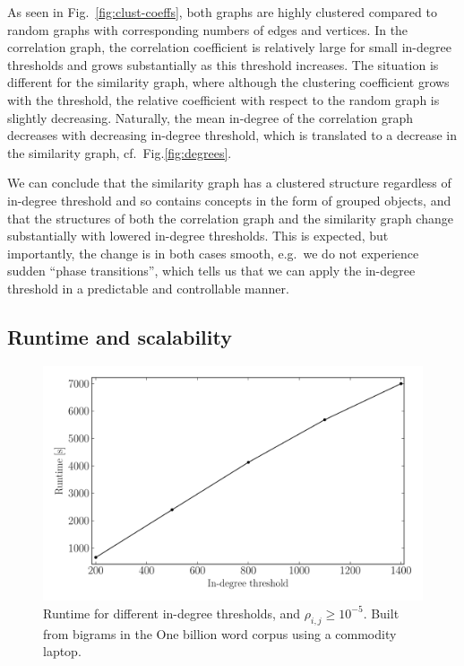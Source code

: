 \documentclass{kais}
\newcommand{\rn}[1]{\rho_{#1}}
\begin{document}
As seen in Fig.\ \ref{fig:clust-coeffs}, both graphs are highly clustered compared to random graphs with corresponding 
numbers of edges and vertices. In the correlation graph, the correlation coefficient is relatively large for small in-degree 
thresholds and grows substantially as this threshold increases. The situation is different for the similarity graph, where although the
clustering coefficient grows with the threshold, the relative coefficient with respect to the random graph is slightly decreasing.
Naturally, the mean in-degree of the correlation graph decreases with decreasing in-degree threshold,
which is translated to a decrease in the similarity graph, cf.\ Fig.\ref{fig:degrees}.

We can conclude that the similarity graph has a clustered structure regardless of in-degree threshold 
and so contains concepts in the form of grouped objects, and that the structures of both the correlation graph 
and the similarity graph change substantially with lowered in-degree thresholds. This is expected, but importantly, 
the change is in both cases smooth, e.g.\ we do not experience sudden ``phase transitions'', which tells us that 
we can apply the in-degree threshold in a predictable and controllable manner.

\subsection{Runtime and scalability}
\label{sec: scalability}

\begin{figure}
\centerline{\includegraphics[width=0.75\columnwidth]{figures/billion-rt-2.pdf}}
\caption{Runtime for different in-degree 
thresholds, and $\rn{i,j} \geq 10^{-5}$. Built from bigrams in the One billion word corpus using a commodity laptop.}
\label{fig:billion-e-runtime}
\end{figure}
\end{document}
